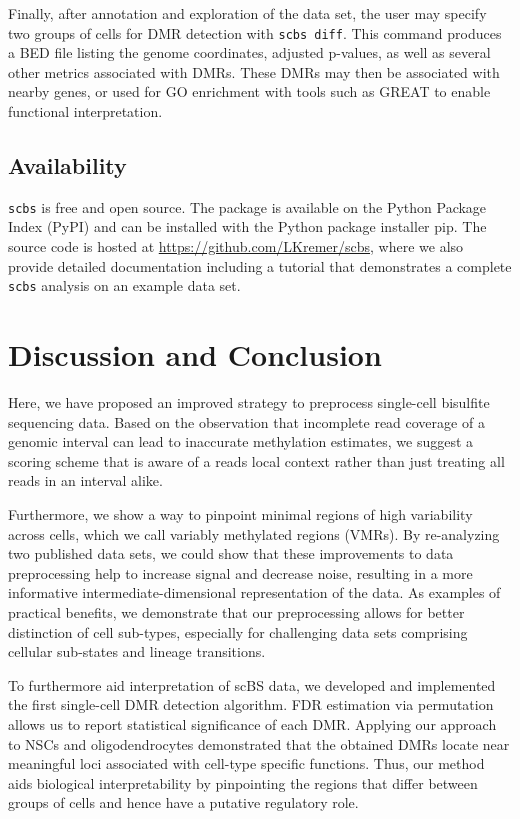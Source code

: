 \documentclass[twocolumn,10pt]{article}
\begin{document}
Finally, after annotation and exploration of the data set, the user may specify two groups of cells for DMR detection with \texttt{scbs diff}.
This command produces a BED file listing the genome coordinates, adjusted p-values, as well as several other metrics associated with DMRs.
These DMRs may then be associated with nearby genes, or used for GO enrichment with tools such as GREAT \citep{mclean2010great} to enable functional interpretation.


\subsection{Availability}

\texttt{scbs} is free and open source.
The package is available on the Python Package Index (PyPI) and can be installed with the Python package installer pip.
The source code is hosted at \href{https://github.com/LKremer/scbs}{https://github.com/LKremer/scbs}, where we also provide detailed documentation including a tutorial that demonstrates a complete \texttt{scbs} analysis on an example data set.


\section{Discussion and Conclusion}

Here, we have proposed an improved strategy to preprocess single-cell bisulfite sequencing data.
Based on the observation that incomplete read coverage of a genomic interval can lead to inaccurate methylation estimates, we suggest a scoring scheme that is aware of a reads local context rather than just treating all reads in an interval alike.

Furthermore, we show a way to pinpoint minimal regions of high variability across cells, which we call variably methylated regions (VMRs).
By re-analyzing two published data sets, we could show that these improvements to data preprocessing help to increase signal and decrease noise, resulting in a more informative intermediate-dimensional representation of the data.
As examples of practical benefits, we demonstrate that our preprocessing allows for better distinction of cell sub-types, especially for challenging data sets comprising cellular sub-states and lineage transitions.

To furthermore aid interpretation of scBS data, we developed and implemented the first single-cell DMR detection algorithm.
FDR estimation via permutation allows us to report statistical significance of each DMR.
Applying our approach to NSCs and oligodendrocytes demonstrated that the obtained DMRs locate near meaningful loci associated with cell-type specific functions.
Thus, our method aids biological interpretability by pinpointing the regions that differ between groups of cells and hence have a putative regulatory role.
\end{document}
